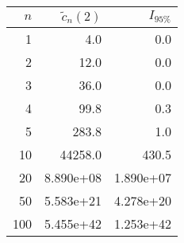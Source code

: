 \begin{tabular}{rrr}
\toprule
 $n$ &  $\tilde{c}_n(2)$ &  $I_{95\%}$ \\
\midrule
   1 &               4.0 &         0.0 \\
   2 &              12.0 &         0.0 \\
   3 &              36.0 &         0.0 \\
   4 &              99.8 &         0.3 \\
   5 &             283.8 &         1.0 \\
  10 &           44258.0 &       430.5 \\
  20 &         8.890e+08 &   1.890e+07 \\
  50 &         5.583e+21 &   4.278e+20 \\
 100 &         5.455e+42 &   1.253e+42 \\
\bottomrule
\end{tabular}

